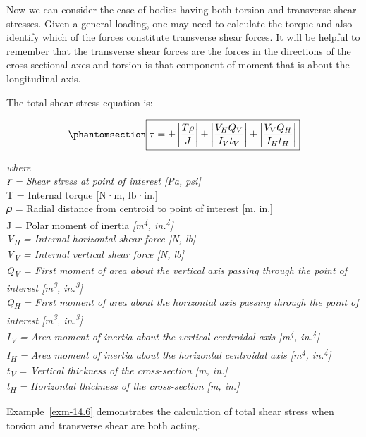 \documentclass[
  letterpaper,
  DIV=11,
  numbers=noendperiod]{scrreprt}
\theoremstyle{definition}
\theoremstyle{remark}
\begin{document}
Now we can consider the case of bodies having both torsion and
transverse shear stresses. Given a general loading, one may need to
calculate the torque and also identify which of the forces constitute
transverse shear forces. It will be helpful to remember that the
transverse shear forces are the forces in the directions of the
cross-sectional axes and torsion is that component of moment that is
about the longitudinal axis.

The total shear stress equation is:

\begin{equation}\phantomsection\label{eq-14.4}{
\boxed{\tau= \pm\left|\frac{T \rho}{J}\right| \pm\left|\frac{V_H Q_V}{I_V t_V}\right| \pm\left|\frac{V_V Q_H}{I_H t_H}\right|}
}\end{equation}

\emph{where}\\
\emph{𝜏 = Shear stress at point of interest {[}Pa, psi{]}}\\
T = Internal torque {[}N·m, lb·in.{]}\\
𝜌 = Radial distance from centroid to point of interest {[}m, in.{]}\\
J = Polar moment of inertia \emph{{[}m\textsuperscript{4},
in.\textsuperscript{4}{]}}\\
\emph{V\textsubscript{H} = Internal horizontal shear force {[}N,
lb{]}}\\
\emph{V\textsubscript{V} = Internal vertical shear force {[}N, lb{]}}\\
\emph{Q\textsubscript{V} = First moment of area about the vertical axis
passing through the point of interest {[}m\textsuperscript{3},
in.\textsuperscript{3}{]}}\\
\emph{Q\textsubscript{H} = First moment of area about the horizontal
axis passing through the point of interest {[}m\textsuperscript{3},
in.\textsuperscript{3}{]}}\\
\emph{I\textsubscript{V} = Area moment of inertia about the vertical
centroidal axis {[}m\textsuperscript{4}, in.\textsuperscript{4}{]}}\\
\emph{I\textsubscript{H} = Area moment of inertia about the horizontal
centroidal axis {[}m\textsuperscript{4}, in.\textsuperscript{4}{]}}\\
\emph{t\textsubscript{V} = Vertical thickness of the cross-section {[}m,
in.{]}}\\
\emph{t\textsubscript{H} = Horizontal thickness of the cross-section
{[}m, in.{]}}

Example~\ref{exm-14.6} demonstrates the calculation of total shear
stress when torsion and transverse shear are both acting.
\end{document}

